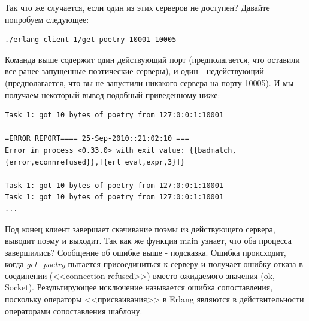 Так что же случается, если один из этих серверов не доступен? 
Давайте попробуем следующее:
\begin{scriptsize}\begin{verbatim}
./erlang-client-1/get-poetry 10001 10005
\end{verbatim}\end{scriptsize}


Команда выше содержит один действующий порт (предполагается, 
что оставили все ранее запущенные поэтические серверы), и 
один - недействующий (предполагается, что вы не запустили 
никакого сервера на порту 10005). И мы получаем некоторый вывод 
подобный приведенному ниже:

\begin{scriptsize}\begin{verbatim}
Task 1: got 10 bytes of poetry from 127:0:0:1:10001

=ERROR REPORT==== 25-Sep-2010::21:02:10 ===
Error in process <0.33.0> with exit value: {{badmatch,{error,econnrefused}},[{erl_eval,expr,3}]}

Task 1: got 10 bytes of poetry from 127:0:0:1:10001
Task 1: got 10 bytes of poetry from 127:0:0:1:10001
...
\end{verbatim}\end{scriptsize}

Под конец клиент завершает скачивание поэмы из 
действующего сервера, выводит поэму и выходит. 
Так как же функция main узнает, что оба процесса 
завершились? Сообщение об ошибке выше - подсказка. 
Ошибка происходит, когда \textit{get\_poetry} пытается 
присоединиться к серверу и получает ошибку отказа в 
соединении (<<connection refused>>) вместо ожидаемого значения ({ok, Socket}). 
Результирующее исключение называется ошибка сопоставления, 
поскольку операторы <<присваивания>> в Erlang являются в 
действительности операторами сопоставления шаблону.
  

